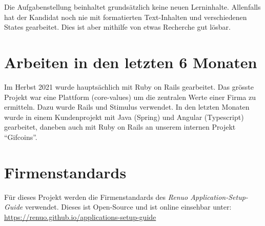 Die Aufgabenstellung beinhaltet grundsätzlich keine neuen Lerninhalte. Allenfalls hat der Kandidat noch nie mit formatierten Text-Inhalten und verschiedenen States gearbeitet. Dies ist aber mithilfe von etwas Recherche gut lösbar.

\section{Arbeiten in den letzten 6 Monaten}

Im Herbst 2021 wurde hauptsächlich mit Ruby on Rails gearbeitet. Das grösste Projekt war eine Plattform (core-values) um die zentralen Werte einer Firma zu ermitteln.
Dazu wurde Rails und Stimulus verwendet. In den letzten Monaten wurde in einem Kundenprojekt mit Java (Spring) und Angular (Typescript) gearbeitet, daneben auch mit Ruby on Rails an unserem internen Projekt “Gifcoins”.

\section{Firmenstandards}

Für dieses Projekt werden die Firmenstandards des \emph{Renuo Application-Setup-Guide} verwendet.
Dieses ist Open-Source und ist online einsehbar unter: \url{https://renuo.github.io/applications-setup-guide}


